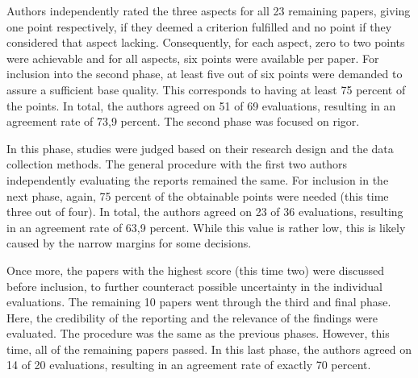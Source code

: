 \documentclass{bmcart}
\begin{document}


Authors independently rated the three aspects for all 23 remaining papers, giving one point respectively, if they deemed a criterion fulfilled and no point if they considered that aspect lacking. Consequently, for each aspect, zero to two points were achievable and for all aspects, six points were available per paper. For inclusion into the second phase, at least five out of six points were demanded to assure a sufficient base quality. This corresponds to having at least 75 percent of the points. In total, the authors agreed on 51 of 69 evaluations, resulting in an agreement rate of 73,9 percent. The second phase was focused on rigor. 



In this phase, studies were judged based on their research design and the data collection methods. The general procedure with the first two authors independently evaluating the reports remained the same. For inclusion in the next phase, again, 75 percent of the obtainable points were needed (this time three out of four). In total, the authors agreed on 23 of 36 evaluations, resulting in an agreement rate of 63,9 percent. While this value is rather low, this is likely caused by the narrow margins for some decisions. 

Once more, the papers with the highest score (this time two) were discussed before inclusion, to further counteract possible uncertainty in the individual evaluations.  The remaining 10 papers went through the third and final phase. Here, the credibility of the reporting and the relevance of the findings were evaluated. The procedure was the same as the previous phases. However, this time, all of the remaining papers passed. In this last phase, the authors agreed on 14 of 20 evaluations, resulting in an agreement rate of exactly 70 percent. 






\end{document}
